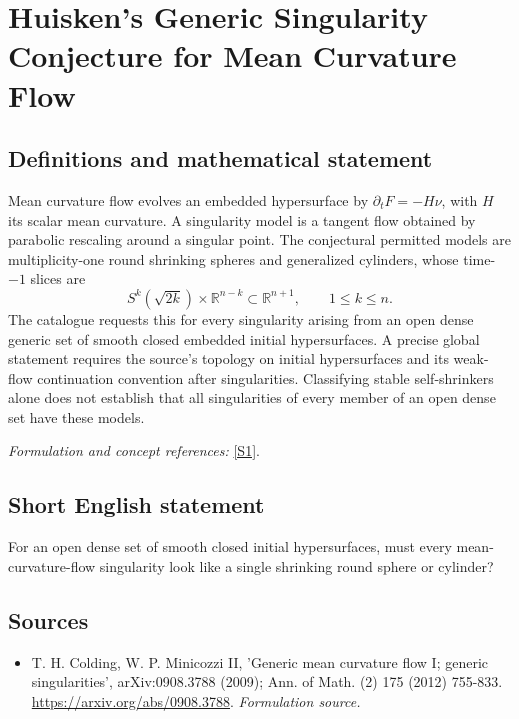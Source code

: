 \documentclass[11pt]{article}
\begin{document}
\section*{\texorpdfstring{Huisken's Generic Singularity Conjecture for Mean Curvature Flow}{Huisken's Generic Singularity Conjecture for Mean Curvature Flow}}\label{30006985}
\subsection{Definitions and mathematical statement}
Mean curvature flow evolves an embedded hypersurface by $\partial_tF=-H\nu$, with $H$ its scalar mean curvature. A singularity model is a tangent flow obtained by parabolic rescaling around a singular point. The conjectural permitted models are multiplicity-one round shrinking spheres and generalized cylinders, whose time-$-1$ slices are
\[
 S^k(\sqrt{2k})\times{\mathbb{R}}^{n-k}\subset{\mathbb{R}}^{n+1},\qquad1\le k\le n.
\]
The catalogue requests this for every singularity arising from an open dense generic set of smooth closed embedded initial hypersurfaces. A precise global statement requires the source's topology on initial hypersurfaces and its weak-flow continuation convention after singularities. Classifying stable self-shrinkers alone does not establish that all singularities of every member of an open dense set have these models.
\par\smallskip\textit{Formulation and concept references:} \href{https://arxiv.org/abs/0908.3788}{[S1]}.

\subsection{Short English statement}
For an open dense set of smooth closed initial hypersurfaces, must every mean-curvature-flow singularity look like a single shrinking round sphere or cylinder?
\subsection{Sources}
\begin{itemize}
\item[S1]T. H. Colding, W. P. Minicozzi II, 'Generic mean curvature flow I; generic singularities', arXiv:0908.3788 (2009); Ann. of Math. (2) 175 (2012) 755-833.
\url{https://arxiv.org/abs/0908.3788}.
\textit{Formulation source.}
\end{itemize}
\end{document}
